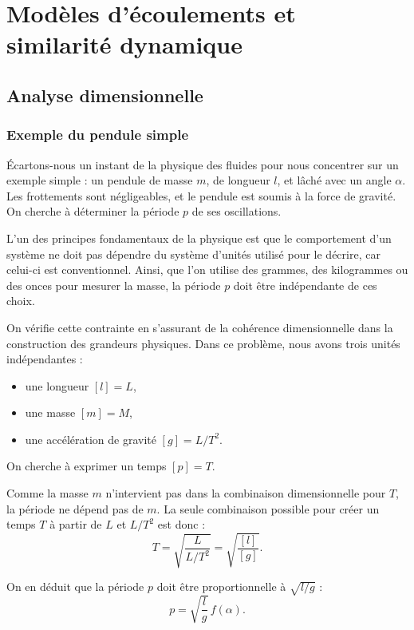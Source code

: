 \chapter{Modèles d'écoulements et similarité dynamique \label{ch:modeles_ecoulement}}

\section{Analyse dimensionnelle}

\subsection{Exemple du pendule simple}
Écartons-nous un instant de la physique des fluides pour nous concentrer sur un exemple simple : un pendule de masse $m$, de longueur $l$, et lâché avec un angle $\alpha$. Les frottements sont négligeables, et le pendule est soumis à la force de gravité. On cherche à déterminer la période $p$ de ses oscillations.

L’un des principes fondamentaux de la physique est que le comportement d’un système ne doit pas dépendre du système d’unités utilisé pour le décrire, car celui-ci est conventionnel. Ainsi, que l’on utilise des grammes, des kilogrammes ou des onces pour mesurer la masse, la période $p$ doit être indépendante de ces choix.

On vérifie cette contrainte en s’assurant de la cohérence dimensionnelle dans la construction des grandeurs physiques. Dans ce problème, nous avons trois unités indépendantes :
\begin{itemize}
  \item une longueur $[l] = L$,
  \item une masse $[m] = M$,
  \item une accélération de gravité $[g] = L/T^2$.
\end{itemize}
On cherche à exprimer un temps $[p] = T$.

Comme la masse $m$ n’intervient pas dans la combinaison dimensionnelle pour $T$, la période ne dépend pas de $m$. La seule combinaison possible pour créer un temps $T$ à partir de $L$ et $L/T^2$ est donc :
\begin{displaymath}
  T = \sqrt{\frac{L}{L/T^2}} = \sqrt{\frac{[l]}{[g]}}.
\end{displaymath}

On en déduit que la période $p$ doit être proportionnelle à $\sqrt{l/g}$ :
\begin{equation}
  p = \sqrt{\frac{l}{g}} \, f(\alpha).
  \label{eq:pendule}
\end{equation}

